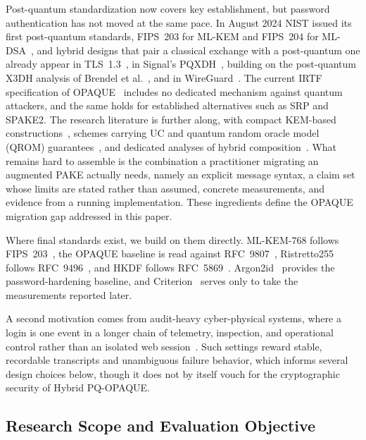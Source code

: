 \documentclass[preprint,12pt]{elsarticle}
\theoremstyle{remark}
\begin{document}
Post-quantum standardization now covers key establishment, but password
authentication has not moved at the same pace. In August 2024 NIST issued its
first post-quantum standards, FIPS~203 for ML-KEM and FIPS~204 for
ML-DSA~\cite{fips203,fips204}, and hybrid designs that pair a classical
exchange with a post-quantum one already appear in TLS~1.3~\cite{stebila2024},
in Signal's PQXDH~\cite{kret2023pqxdh}, building on the post-quantum X3DH
analysis of Brendel et al.~\cite{brendel2020}, and in
WireGuard~\cite{hulsing2021}. The current IRTF specification of
OPAQUE~\cite{ietf-opaque} includes no dedicated mechanism against quantum
attackers, and the same holds for established alternatives such as SRP and
SPAKE2. The research literature is further along, with compact KEM-based
constructions~\cite{arriaga2024}, schemes carrying UC and quantum random
oracle model (QROM) guarantees~\cite{lyu2024uc}, and dedicated analyses of
hybrid composition~\cite{hesse2024,lyu2024hybrid}. What remains hard to
assemble is the combination a practitioner migrating an augmented PAKE actually
needs, namely an explicit message syntax, a claim set whose limits are stated
rather than assumed, concrete measurements, and evidence from a running
implementation. These ingredients define the OPAQUE migration gap addressed in
this paper.

Where final standards exist, we build on them directly. ML-KEM-768 follows
FIPS~203~\cite{fips203}, the OPAQUE baseline is read against
RFC~9807~\cite{ietf-opaque}, Ristretto255 follows RFC~9496~\cite{devalence2024},
and HKDF follows RFC~5869~\cite{krawczyk2010}. Argon2id~\cite{biryukov2016}
provides the password-hardening baseline, and Criterion~\cite{heisler2023}
serves only to take the measurements reported later.

A second motivation comes from audit-heavy cyber-physical systems, where a login
is one event in a longer chain of telemetry, inspection, and operational control
rather than an isolated web session~\cite{svystun2025dytam,svystun2024thermal,lysyi2025fire}.
Such settings reward stable, recordable transcripts and unambiguous failure
behavior, which informs several design choices below, though it does not by
itself vouch for the cryptographic security of Hybrid PQ-OPAQUE.

\subsection{Research Scope and Evaluation Objective}
\end{document}
